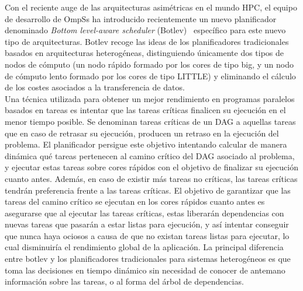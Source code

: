 
Con el reciente auge de las arquitecturas asimétricas en el mundo HPC, el
equipo de desarrollo de OmpSs ha introducido recientemente un nuevo
planificador denominado \emph{Bottom level-aware scheduler}
(Botlev)~\cite{botlev} específico para este nuevo tipo de
arquitecturas. Botlev recoge las ideas de los planificadores tradicionales
basados en arquitecturas heterogéneas, distinguiendo únicamente dos tipos
de nodos de cómputo (un nodo rápido formado por los cores de tipo big, y un
nodo de cómputo lento formado por los cores de tipo LITTLE) y eliminando el
cálculo de los costes asociados a
la transferencia de datos. \\

Una técnica utilizada para obtener un mejor rendimiento en programas
paralelos basados en tareas es intentar que las tareas críticas finalicen
su ejecución en el menor tiempo posible. Se denominan tareas críticas de un
DAG a aquellas tareas que en caso de retrasar su ejecución, producen un
retraso en la ejecución del problema. El planificador \botlev persigue este
objetivo intentando calcular de manera dinámica qué tareas pertenecen al
camino crítico del DAG asociado al problema, y ejecutar estas tareas sobre
cores rápidos con el objetivo de finalizar su ejecución cuanto
antes. Además, en caso de existir más tareas no críticas, las tareas
críticas tendrán preferencia frente a las tareas críticas. El objetivo de
garantizar que las tareas del camino crítico se ejecutan en los cores
rápidos cuanto antes es asegurarse que al ejecutar las tareas críticas,
estas liberarán dependencias con nuevas tareas que pasarán a estar listas
para ejecución, y así intentar conseguir que nunca haya \wts ociosos a
causa de que no existan tareas listas para ejecutar, lo cual disminuiría el
rendimiento global de la aplicación. La principal diferencia entre botlev y
los planificadores tradicionales para sistemas heterogéneos es que \botlev
toma las decisiones en tiempo dinámico sin necesidad de conocer de antemano
información sobre las tareas, o al forma del árbol de dependencias.


